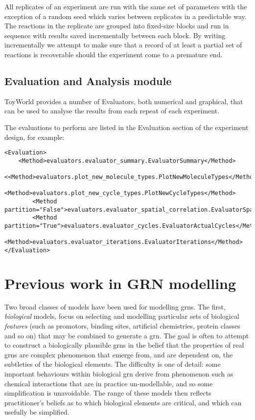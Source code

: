 All replicates of an experiment are run with the same set of parameters
with the exception of a random seed which varies between replicates in a
predictable way. The reactions in the replicate are grouped into
fixed-size blocks and run in sequence with results saved incrementally
between each block. By writing incrementally we attempt to make sure
that a record of at least a partial set of reactions is recoverable
should the experiment come to a premature end.

\section{Evaluation and Analysis module}\label{evaluation-and-analysis-module}

ToyWorld provides a number of Evaluators, both numerical and graphical,
that can be used to analyse the results from each repeat of each
experiment.

The evaluations to perform are listed in the Evaluation section of the
experiment design, for example:

\begin{verbatim}
<Evaluation>
    <Method>evaluators.evaluator_summary.EvaluatorSummary</Method>
        <<Method>evaluators.plot_new_molecule_types.PlotNewMoleculeTypes</Method>
        <Method>evaluators.plot_new_cycle_types.PlotNewCycleTypes</Method>
        <Method partition="False">evaluators.evaluator_spatial_correlation.EvaluatorSpatialCorrelation</Method>
        <Method partition="True">evaluators.evaluator_cycles.EvaluatorActualCycles</Method>
        <Method>evaluators.evaluator_iterations.EvaluatorIterations</Method>
</Evaluation>
\end{verbatim}

\chapter{Previous work in GRN modelling}\label{previous-work-in-grn-modelling}

Two broad classes of models have been used for modelling \glspl{grn}. The first, \emph{biological} models, focus on selecting and modelling particular sets of biological \emph{features} (such as promotors, binding sites, artificial chemistries, protein classes and so on) that may be combined to generate a \gls{grn}. The goal is often to attempt to construct a biologically plausible \glspl{grn} in the belief that the properties of real \glspl{grn} are complex phenomenon that emerge from, and are dependent on, the subtleties of the biological elements. The difficulty is one of detail: some important behaviours within biological \gls{grn} derive from phenomenon such as chemical interactions that are in practice un-modellable, and so some simplification is unavoidable. The range of these models then reflects practitioner's beliefs as to which biological elements are critical, and which can usefully be simplified.

